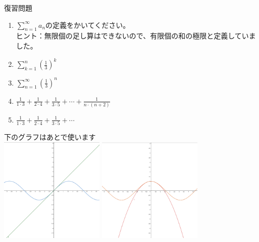 \documentclass[12pt,a4paper]{jsarticle}
\begin{document}
復習問題
\begin{enumerate}
    \item $\sum_{n=1}^\infty a_n$の定義をかいてください。
    \\ヒント：無限個の足し算はできないので、有限個の和の極限と定義していました。\everymath{\displaystyle}
    \item $\sum_{k=1}^n \left(\frac{1}{3}\right)^k$
    \item $\sum_{n=1}^\infty \left(\frac{1}{3}\right)^n$
    \item $\frac{1}{1\cdot 3}+\frac{1}{2\cdot 4}+\frac{1}{3\cdot 5}+\cdots +\frac{1}{n\cdot (n+2)}$
    \item $\frac{1}{1\cdot 3}+\frac{1}{2\cdot 4}+\frac{1}{3\cdot 5}+\cdots$
\end{enumerate}
下のグラフはあとで使います\\
\includegraphics[width=5cm]{graphs/x-and-sin.png}
\includegraphics[width=5cm]{graphs/x2-and-cos.png}
\end{document}
